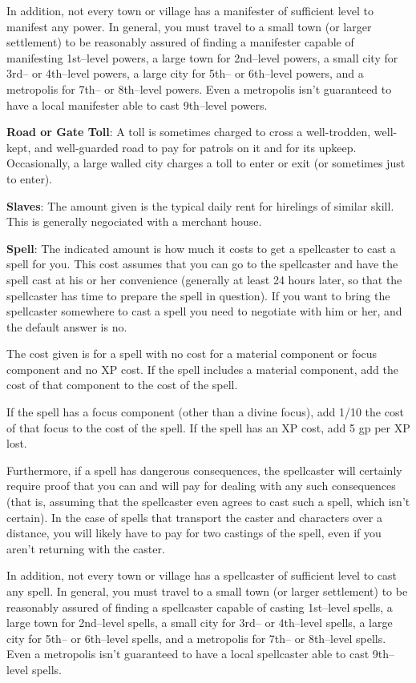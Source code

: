 In addition, not every town or village has a manifester of sufficient level to manifest any power. In general, you must travel to a small town (or larger settlement) to be reasonably assured of finding a manifester capable of manifesting 1st--level powers, a large town for 2nd--level powers, a small city for 3rd-- or 4th--level powers, a large city for 5th-- or 6th--level powers, and a metropolis for 7th-- or 8th--level powers. Even a metropolis isn't guaranteed to have a local manifester able to cast 9th--level powers.

\textbf{Road or Gate Toll}: A toll is sometimes charged to cross a well-trodden, well-kept, and well-guarded road to pay for patrols on it and for its upkeep. Occasionally, a large walled city charges a toll to enter or exit (or sometimes just to enter).

\textbf{Slaves}: The amount given is the typical daily rent for hirelings of similar skill. This is generally negociated with a merchant house.

\textbf{Spell}: The indicated amount is how much it costs to get a spellcaster to cast a spell for you. This cost assumes that you can go to the spellcaster and have the spell cast at his or her convenience (generally at least 24 hours later, so that the spellcaster has time to prepare the spell in question). If you want to bring the spellcaster somewhere to cast a spell you need to negotiate with him or her, and the default answer is no.

The cost given is for a spell with no cost for a material component or focus component and no XP cost. If the spell includes a material component, add the cost of that component to the cost of the spell.

If the spell has a focus component (other than a divine focus), add 1/10 the cost of that focus to the cost of the spell. If the spell has an XP cost, add 5 gp per XP lost.

Furthermore, if a spell has dangerous consequences, the spellcaster will certainly require proof that you can and will pay for dealing with any such consequences (that is, assuming that the spellcaster even agrees to cast such a spell, which isn't certain). In the case of spells that transport the caster and characters over a distance, you will likely have to pay for two castings of the spell, even if you aren't returning with the caster.

In addition, not every town or village has a spellcaster of sufficient level to cast any spell. In general, you must travel to a small town (or larger settlement) to be reasonably assured of finding a spellcaster capable of casting 1st--level spells, a large town for 2nd--level spells, a small city for 3rd-- or 4th--level spells, a large city for 5th-- or 6th--level spells, and a metropolis for 7th-- or 8th--level spells. Even a metropolis isn't guaranteed to have a local spellcaster able to cast 9th--level spells.
